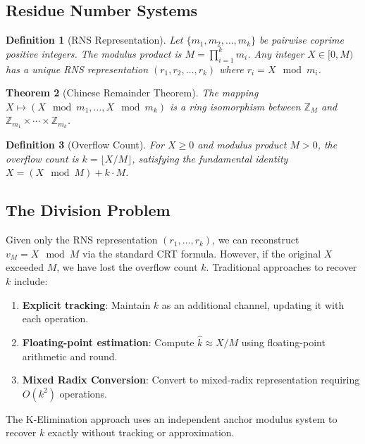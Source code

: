\documentclass[11pt,a4paper]{article}
\newtheorem{theorem}{Theorem}[section]
\newtheorem{definition}[theorem]{Definition}
\begin{document}
\subsection{Residue Number Systems}

\begin{definition}[RNS Representation]
Let $\{m_1, m_2, \ldots, m_k\}$ be pairwise coprime positive integers. The modulus product is $M = \prod_{i=1}^{k} m_i$. Any integer $X \in [0, M)$ has a unique RNS representation $(r_1, r_2, \ldots, r_k)$ where $r_i = X \mod m_i$.
\end{definition}

\begin{theorem}[Chinese Remainder Theorem]
The mapping $X \mapsto (X \mod m_1, \ldots, X \mod m_k)$ is a ring isomorphism between $\mathbb{Z}_M$ and $\mathbb{Z}_{m_1} \times \cdots \times \mathbb{Z}_{m_k}$.
\end{theorem}

\begin{definition}[Overflow Count]
For $X \geq 0$ and modulus product $M > 0$, the overflow count is $k = \lfloor X/M \rfloor$, satisfying the fundamental identity $X = (X \mod M) + k \cdot M$.
\end{definition}

\subsection{The Division Problem}

Given only the RNS representation $(r_1, \ldots, r_k)$, we can reconstruct $v_M = X \mod M$ via the standard CRT formula. However, if the original $X$ exceeded $M$, we have lost the overflow count $k$. Traditional approaches to recover $k$ include:

\begin{enumerate}[noitemsep]
    \item \textbf{Explicit tracking}: Maintain $k$ as an additional channel, updating it with each operation.
    \item \textbf{Floating-point estimation}: Compute $\hat{k} \approx X/M$ using floating-point arithmetic and round.
    \item \textbf{Mixed Radix Conversion}: Convert to mixed-radix representation requiring $O(k^2)$ operations.
\end{enumerate}

The K-Elimination approach uses an independent anchor modulus system to recover $k$ exactly without tracking or approximation.
\end{document}
